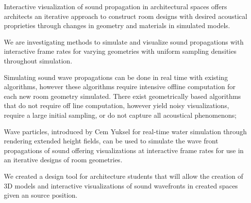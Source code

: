 \documentclass{thesis}
\author{Max Espinoza}
\begin{document}
 

\titlepage             %


\tableofcontents       %




%


Interactive visualization of sound propagation in architectural spaces offers architects an iterative approach to construct room designs with desired acoustical proprieties through changes in geometry and materials in simulated models.

We are investigating methods to simulate and visualize sound propagations with interactive frame rates for varying geometries with uniform sampling densities throughout simulation.

Simulating sound wave propagations can be done in real time with existing algorithms, however these algorithms require intensive offline computation for each new room geometry simulated.
There exist geometrically based algorithms that do not require off line computation, however yield noisy visualizations, require a large initial sampling, or do not capture all acoustical phenomenons; 

Wave particles\cite{Yuksel2010}, introduced by Cem Yuksel for real-time  water simulation through rendering extended height fields, can be used to simulate the wave front propagations of sound offering visualizations at interactive frame rates for use in an iterative designs of room geometries.

We created a design tool for architecture students that will allow the  creation of 3D models and interactive visualizations of sound wavefronts in created spaces given an source position.
\end{document}
